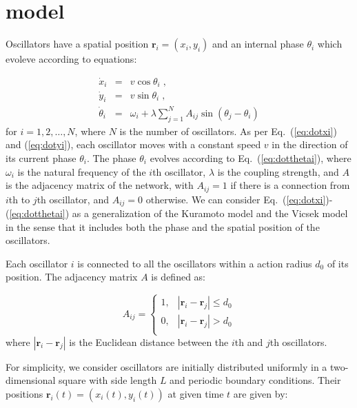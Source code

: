 \documentclass[%
 aip,
 amsmath,amssymb,
 reprint,%
]{revtex4-1}
\begin{document}
\section{model}
Oscillators have a spatial position $\mathbf{r}_i=\left( x_i, y_i \right)$ and an internal phase $\theta_i$ which evoleve according to equations:

\begin{eqnarray}
    \dot{x}_i&=&v\cos \theta _i\;,\label{eq:dotxi}
  \\
    \dot{y}_i&=&v\sin \theta _i\;,\label{eq:dotyi}
  \\
    \dot{\theta}_i&=&\omega _i+\lambda \sum_{j=1}^N{A_{ij}\sin \left( \theta _j-\theta _i \right)}
    \label{eq:dotthetai}
\end{eqnarray}
for $i=1,2,\ldots,N$, where $N$ is the number of oscillators. As per Eq.~(\ref{eq:dotxi}) and (\ref{eq:dotyi}), each oscillator moves with a constant speed $v$ in the direction of its current phase $\theta_i$. The phase $\theta_i$ evolves according to Eq.~(\ref{eq:dotthetai}), where $\omega_i$ is the natural frequency of the $i$th oscillator, $\lambda$ is the coupling strength, and $A$ is the adjacency matrix of the network, with $A_{ij}=1$ if there is a connection from $i$th to $j$th oscillator, and $A_{ij}=0$ otherwise. We can consider Eq.~(\ref{eq:dotxi})-(\ref{eq:dotthetai}) as a generalization of the Kuramoto model and the Vicsek model in the sense that it includes both the phase and the spatial position of the oscillators.

Each oscillator $i$ is connected to all the oscillators within a
action radius $d_0$ of its position. The adjacency matrix $A$ is defined as:

\begin{equation}
    A_{ij}=\begin{cases}
        1,&		\left| \mathbf{r}_i-\mathbf{r}_j \right|\le d_0\\
        0,&		\left| \mathbf{r}_i-\mathbf{r}_j \right|>d_0\\
    \end{cases}
\end{equation}
where $\left| \mathbf{r}_i-\mathbf{r}_j \right|$ is the Euclidean distance between the $i$th and $j$th oscillators. 

For simplicity, we consider oscillators are initially distributed uniformly in a two-dimensional square with side length $L$ and periodic boundary conditions. Their positions $\mathbf{r}_i\left( t \right) =\left( x_i\left( t \right) ,y_i\left( t \right) \right) $ at given time $t$ are given by:
\end{document}
